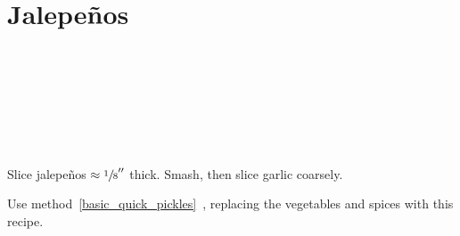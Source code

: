 \section{Jalepe\~{n}os}

\begin{ingredientcolumns}[1]
    \begin{ingredientblock}
        \\
        \\
        \\
        \\
        \\
        \\
    \end{ingredientblock}
\end{ingredientcolumns}

\begin{preparation}
\item Slice jalepe\~{n}os $\approx \sfrac{1}{8}''$ thick.
    Smash, then slice garlic coarsely.

\item Use method~\ref{basic_quick_pickles}~, replacing the vegetables and spices
    with this recipe.
\end{preparation}

\recipeend%
